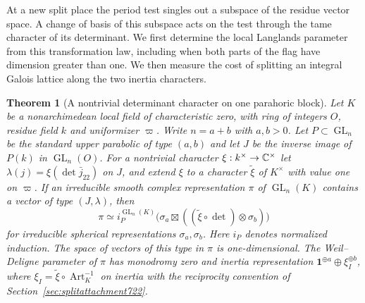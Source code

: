 \documentclass[a4paper,11pt]{article}
\newtheorem{theorem}[proposition]{Theorem}
\theoremstyle{definition}
\theoremstyle{remark}
\numberwithin{equation}{section}
\newcommand{\GL}{\operatorname{GL}}
\begin{document}
At a new split place the period test singles out a subspace of the
residue vector space. A change of basis of this subspace acts on
the test through the tame character of its determinant. We first
determine the local Langlands parameter from this transformation
law, including when both parts of the flag have dimension greater
than one. We then measure the cost of splitting an integral Galois
lattice along the two inertia characters.

\begin{theorem}[A nontrivial determinant character on one parahoric block]
\leavevmode\label{thm:twistblocks738}
Let \(K\) be a nonarchimedean local field of characteristic zero,
with ring of integers \(O\), residue field \(k\) and uniformizer
\(\varpi\). Write \(n=a+b\) with \(a,b>0\). Let \(P\subset\GL_n\)
be the standard upper parabolic of type \((a,b)\) and let \(J\)
be the inverse image of \(P(k)\) in \(\GL_n(O)\). For a
nontrivial character \(\xi:k^\times\to\mathbb C^\times\) let
\(\lambda(j)=\xi(\det\bar j_{22})\) on \(J\), and extend \(\xi\)
to a character \(\widetilde\xi\) of \(K^\times\) with value one on
\(\varpi\). If an irreducible smooth complex representation \(\pi\)
of \(\GL_n(K)\) contains a vector of type \((J,\lambda)\), then
\[
 \pi\simeq i_P^{\GL_n(K)}
       \bigl(\sigma_a\boxtimes
                 ((\widetilde\xi\circ\det)\otimes\sigma_b)\bigr)
\]
for irreducible spherical representations \(\sigma_a,\sigma_b\).
Here \(i_P\) denotes normalized induction. The space of vectors of
this type in \(\pi\) is one-dimensional. The Weil--Deligne
parameter of \(\pi\) has monodromy zero and inertia representation
\(\mathbf1^{\oplus a}\oplus\xi_I^{\oplus b}\), where
\(\xi_I=\widetilde\xi\circ\operatorname{Art}_K^{-1}\) on inertia
with the reciprocity convention of Section~\ref{sec:splitattachment722}.
\end{theorem}
\end{document}
